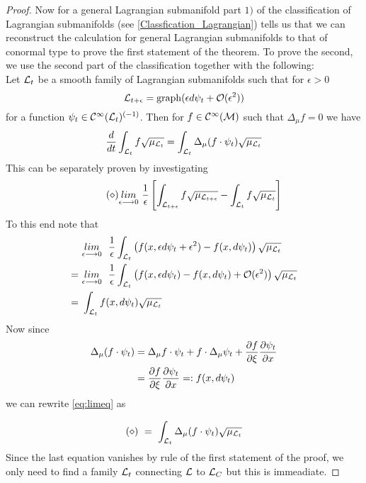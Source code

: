 \begin{theo}
\begin{proof}
  Now for a general Lagrangian submanifold part $1)$ of the classification of Lagrangian submanifolds (see \ref{Classfication_Lagrangian}) tells us that we can reconstruct the calculation for general Lagrangian submanifolds to that of conormal type to prove the first statement of the theorem. To prove the second, we use the second part of the classification together with the following:\\

  Let $\mathcal{L}_t$ be a smooth family of Lagrangian submanifolds such that for $\epsilon > 0$
  \begin{equation}
    \LL_{t+\epsilon} = \graph(\epsilon d\psi_t + \OO(\epsilon^2))
  \end{equation}
  for a function $\psi_t \in \mathcal{C}^{\infty}(\mathcal{L}_t)^{(-1)}$. Then for $f \in \mathcal{C}^{\infty}(\mathcal{M})$ such that $\Delta_\mu f = 0$ we have
  \begin{equation}
    \frac{d }{d t} \int_{\mathcal{L}_t} f \sqrt{\mu_{\mathcal{L}_t}} = \int_{\mathcal{L}_t} \Delta_\mu (f \cdot \psi_t) \sqrt{\mu_{\mathcal{L}_t}}
  \end{equation}
  This can be separately proven by investigating
  \begin{equation}\tag{$\diamond$} \label{eq:limeq}
    \limit{\epsilon \lra 0} \ \frac{1}{\epsilon} \left[ \int_{\LL_{t + \epsilon}} f \sqrt{\mu_{\LL_{t + \epsilon}}} - \int_{\LL_{t}} f \sqrt{\mu_{\LL_{t}}} \right]
  \end{equation}
  To this end note that
  \begin{align}
    &\limit{\epsilon \lra 0} \ \ \frac{1}{\epsilon} \int_{\LL_{t}} \left( f(x, \epsilon d\psi_t + \epsilon^2) - f(x, d\psi_t) \right) \sqrt{\mu_{\LL_{t}}} \\
    = \ &\limit{\epsilon \lra 0} \ \ \frac{1}{\epsilon} \int_{\LL_{t}} \left( f(x, \epsilon d\psi_t) - f(x, d\psi_t) + \OO(\epsilon^2) \right) \sqrt{\mu_{\LL_{t}}} \\
    = \ &\int_{\LL_{t}} f(x, d\psi_t) \sqrt{\mu_{\LL_{t}}}
  \end{align}
  Now since
  \begin{align}
    \Delta_\mu(f \cdot \psi_t) &= \Delta_\mu f \cdot \psi_t + f \cdot \Delta_\mu \psi_t + \frac{\partial f}{\partial \xi} \frac{\partial \psi_t}{\partial x}\\
    &= \frac{\partial f}{\partial \xi} \frac{\partial \psi_t}{\partial x} =: f(x, d\psi_t)
  \end{align}
  we can rewrite \eqref{eq:limeq} as

  \begin{equation}
    (\diamond) \ = \ \int_{\mathcal{L}_{t}} \Delta_\mu (f \cdot \psi_t) \sqrt{\mu_{\mathcal{L}_{t}}}
  \end{equation}
  Since the last equation vanishes by rule of the first statement of the proof, we only need to find a family $\mathcal{L}_t$ connecting $\mathcal{L}$ to $\mathcal{L}_C$ but this is immeadiate.
\end{proof}
\end{theo}

